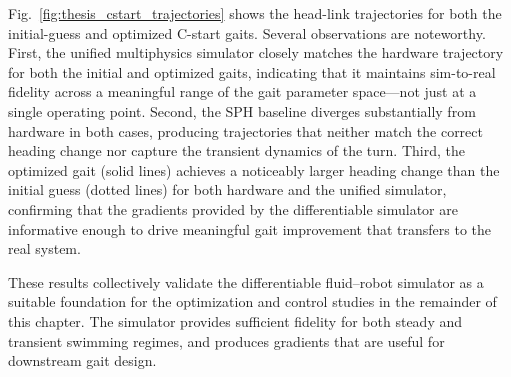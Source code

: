 Fig.~\ref{fig:thesis_cstart_trajectories} shows the head-link trajectories for both the initial-guess and optimized C-start gaits. Several observations are noteworthy. First, the unified multiphysics simulator closely matches the hardware trajectory for both the initial and optimized gaits, indicating that it maintains sim-to-real fidelity across a meaningful range of the gait parameter space---not just at a single operating point. Second, the SPH baseline diverges substantially from hardware in both cases, producing trajectories that neither match the correct heading change nor capture the transient dynamics of the turn. Third, the optimized gait (solid lines) achieves a noticeably larger heading change than the initial guess (dotted lines) for both hardware and the unified simulator, confirming that the gradients provided by the differentiable simulator are informative enough to drive meaningful gait improvement that transfers to the real system.

These results collectively validate the differentiable fluid--robot simulator as a suitable foundation for the optimization and control studies in the remainder of this chapter. The simulator provides sufficient fidelity for both steady and transient swimming regimes, and produces gradients that are useful for downstream gait design.





